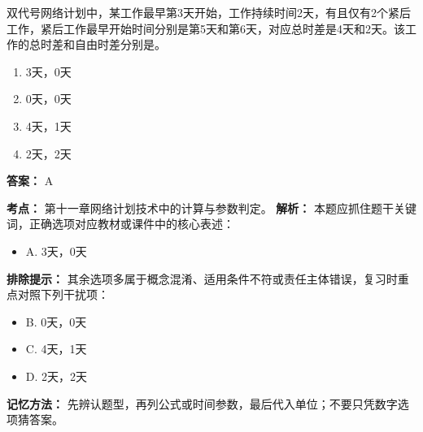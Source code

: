 \documentclass[UTF8,fontset=fandol,11pt]{ctexart}
\begin{document}
\vspace{0.2em}

\begin{quizbox}[title={第 4 题}]
双代号网络计划中，某工作最早第3天开始，工作持续时间2天，有且仅有2个紧后工作，紧后工作最早开始时间分别是第5天和第6天，对应总时差是4天和2天。该工作的总时差和自由时差分别是。\\
\begin{enumerate}[label=\Alph*.]
\item 3天，0天
\item 0天，0天
\item 4天，1天
\item 2天，2天
\end{enumerate}
\textbf{答案：} A
\vspace{0.25em}
\begin{answerbox}[title={考点解析}]
\textbf{考点：} 第十一章网络计划技术中的计算与参数判定。
\textbf{解析：} 本题应抓住题干关键词，正确选项对应教材或课件中的核心表述：
\begin{itemize}
\item A. 3天，0天
\end{itemize}
\textbf{排除提示：} 其余选项多属于概念混淆、适用条件不符或责任主体错误，复习时重点对照下列干扰项：
\begin{itemize}
\item B. 0天，0天
\item C. 4天，1天
\item D. 2天，2天
\end{itemize}
\textbf{记忆方法：} 先辨认题型，再列公式或时间参数，最后代入单位；不要只凭数字选项猜答案。
\end{answerbox}
\end{quizbox}

\vspace{0.2em}
\end{document}
